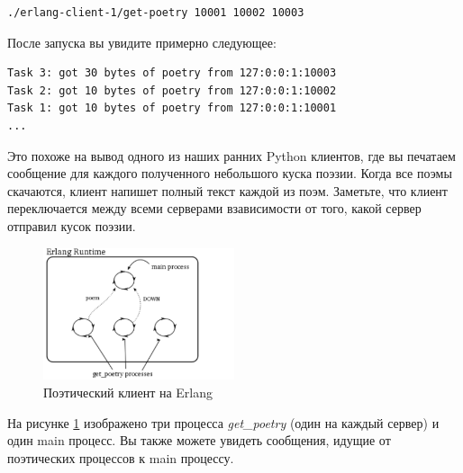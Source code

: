 \begin{scriptsize}\begin{verbatim}
./erlang-client-1/get-poetry 10001 10002 10003
\end{verbatim}\end{scriptsize}

После запуска вы увидите примерно следующее:

\begin{scriptsize}\begin{verbatim}
Task 3: got 30 bytes of poetry from 127:0:0:1:10003
Task 2: got 10 bytes of poetry from 127:0:0:1:10002
Task 1: got 10 bytes of poetry from 127:0:0:1:10001
...
\end{verbatim}\end{scriptsize}

Это похоже на вывод одного из наших ранних Python 
клиентов, где вы печатаем сообщение для каждого полученного небольшого 
куска поэзии. Когда все поэмы скачаются, клиент напишет 
полный текст каждой из поэм. Заметьте, что клиент переключается 
между всеми серверами взависимости от того, какой сервер отправил кусок поэзии.

\begin{figure}[h]
\begin{center}
    \includegraphics[width=0.5\textwidth]{images/erlang-3.pdf}
    \caption{Поэтический клиент на Erlang\label{fig:erlang-3}}
\end{center}
\end{figure}


На рисунке \ref{fig:erlang-3}  изображено три процесса \textit{get\_poetry} (один 
на каждый сервер) и один main процесс. Вы также можете увидеть 
сообщения, идущие от поэтических процессов к main процессу. 


